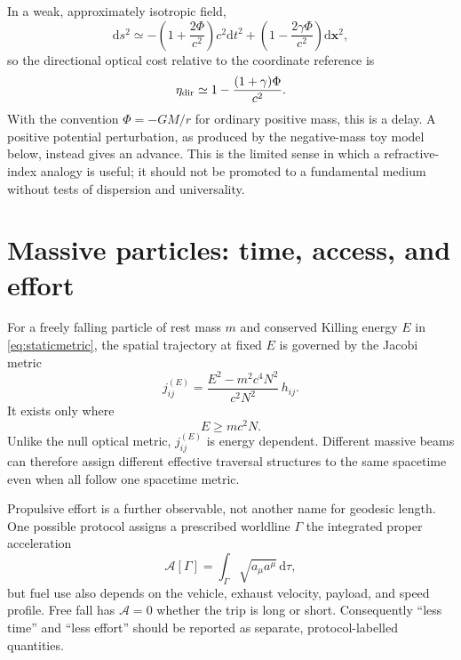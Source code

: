 \documentclass[aps,prd,twocolumn,amsmath,amssymb,nofootinbib]{revtex4-2}
\newcommand{\dd}{\mathrm{d}}
\begin{document}
In a weak, approximately isotropic field,
\begin{equation}
 \dd s^2\simeq
 -\left(1+\frac{2\Phi}{c^2}\right)c^2\dd t^2
 +\left(1-\frac{2\gamma\Phi}{c^2}\right)\dd\boldsymbol{x}^2,
\end{equation}
so the directional optical cost relative to the coordinate reference is
\begin{equation}
 \eta_{\rm dir}\simeq
 1-\frac{(1+\gamma)\Phi}{c^2}.
 \label{eq:weakopticalcost}
\end{equation}
With the convention $\Phi=-GM/r$ for ordinary positive mass, this is a delay.
A positive potential perturbation, as produced by the negative-mass toy model
below, instead gives an advance.  This is the limited sense in which a
refractive-index analogy is useful; it should not be promoted to a fundamental
medium without tests of dispersion and universality.

\section{Massive particles: time, access, and effort}
\label{sec:massive}

For a freely falling particle of rest mass $m$ and conserved Killing energy
$E$ in \eqref{eq:staticmetric}, the spatial trajectory at fixed $E$ is governed
by the Jacobi metric \cite{gibbons-2016-jacobi}
\begin{equation}
 j^{(E)}_{ij}
 =\frac{E^2-m^2c^4N^2}{c^2N^2}\,h_{ij}.
 \label{eq:jacobimetric}
\end{equation}
It exists only where
\begin{equation}
 E\geq mc^2N.
 \label{eq:accesscondition}
\end{equation}
Unlike the null optical metric, $j^{(E)}_{ij}$ is energy dependent.  Different
massive beams can therefore assign different effective traversal structures to
the same spacetime even when all follow one spacetime metric.

Propulsive effort is a further observable, not another name for geodesic
length.  One possible protocol assigns a prescribed worldline $\Gamma$ the
integrated proper acceleration
\begin{equation}
 \mathcal A[\Gamma]=
 \int_{\Gamma}\sqrt{a_{\mu}a^{\mu}}\,\dd\tau,
 \label{eq:properacccost}
\end{equation}
but fuel use also depends on the vehicle, exhaust velocity, payload, and speed
profile.  Free fall has $\mathcal A=0$ whether the trip is long or short.
Consequently ``less time'' and ``less effort'' should be reported as separate,
protocol-labelled quantities.
\end{document}
